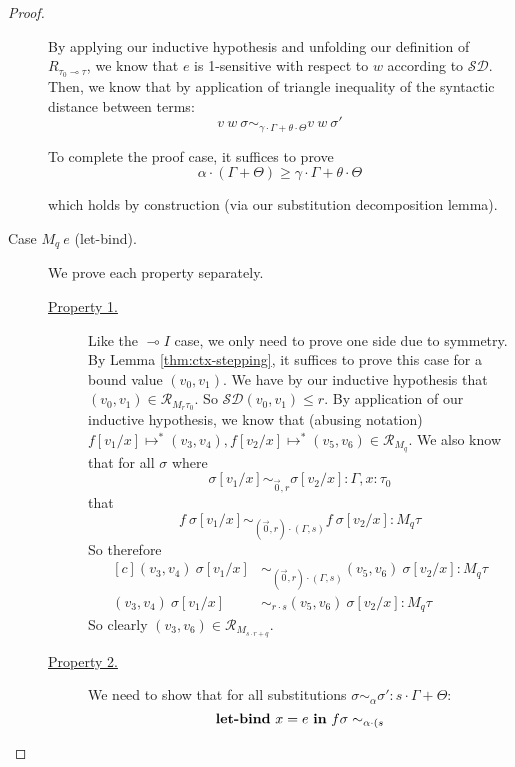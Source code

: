 \begin{proof}
\begin{description}
      By applying our inductive hypothesis and unfolding our definition of
      $R_{\tau_0 \multimap \tau}$, we know that $e$ is 
      1-sensitive with respect to $w$ according to $\mathcal{SD}$. 
      Then, we know that by application of triangle inequality of the syntactic
      distance between terms:
      $$v~w~\sigma \sim_{\gamma \cdot \Gamma + \theta \cdot \Theta} v~w~\sigma'$$

      To complete the proof case, it suffices to prove 
      $$\alpha \cdot (\Gamma + \Theta) \geq \gamma \cdot \Gamma + \theta \cdot \Theta$$

      which holds by construction (via our substitution decomposition lemma).
    \item[Case $M_q~e$ (let-bind).] 
      We prove each property separately.
      \begin{description}
        \item[\underline{Property 1.}]
          Like the $\multimap I$ case, we only need to prove one side due to
          symmetry. By Lemma \ref{thm:ctx-stepping}, it suffices to prove this
          case for a bound value $(v_0, v_1)$. 
          We have by our inductive hypothesis that $(v_0, v_1) \in \mathcal{R}_{M_r
          \tau_0}$. So $\mathcal{SD}(v_0, v_1) \leq r$. By application of our
          inductive hypothesis, we know that (abusing notation) 
          $f[v_1/x] \mapsto^{*} (v_3, v_4), f[v_2/x] \mapsto^{*} (v_5, v_6) \in \mathcal{R}_{M_q}$.
          We also know that for all $\sigma$ where
          $$\sigma[v_1/x] \sim_{\vec{0}, r} \sigma[v_2/x] : \Gamma, x : \tau_0$$
          that
          $$f~\sigma[v_1/x] \sim_{(\vec{0},r) \cdot (\Gamma, s)} f~\sigma[v_2/x] : M_q \tau$$
          So therefore
          \begin{equation}
            \begin{aligned}[c]
              (v_3, v_4)~\sigma[v_1/x] &\sim_{(\vec{0},r) \cdot (\Gamma, s)} (v_5, v_6)~\sigma[v_2/x] : M_q \tau \\
              (v_3, v_4)~\sigma[v_1/x] &\sim_{r \cdot s} (v_5, v_6)~\sigma[v_2/x] : M_q \tau
            \end{aligned}
          \end{equation}
          So clearly $(v_3, v_6) \in \mathcal{R}_{M_{s \cdot r + q}}$.
        \item[\underline{Property 2.}]
          We need to show that for all substitutions $\sigma \sim_{\alpha}
          \sigma' : s \cdot \Gamma + \Theta$:
          $$\textbf{let-bind}~x = e \ \textbf{in} \ f \sigma \sim_{\alpha \cdot (s
}$$
\end{description}
\end{description}
\end{proof}
